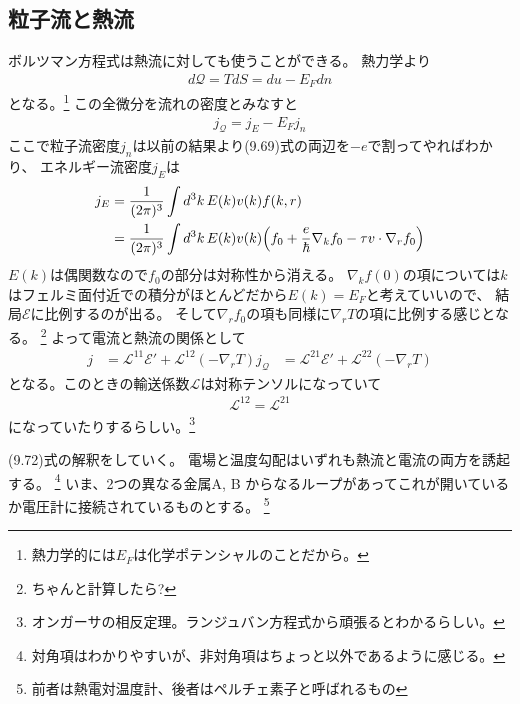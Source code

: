 \documentclass[11pt,dvipdfmx,a4paper]{jsarticle}
\begin{document}
\subsection*{粒子流と熱流}
ボルツマン方程式は熱流に対しても使うことができる。
熱力学より
\begin{align}
    d\mathcal{Q} = T dS = du - E_F dn %
\end{align}
となる。\footnote{熱力学的には\(E_F\)は化学ポテンシャルのことだから。}
この全微分を流れの密度とみなすと
\begin{align}
    j_\mathcal{Q} = j_E - E_F j_n %
\end{align}
ここで粒子流密度\(j_n\)は以前の結果より(9.69)式の両辺を\(-e\)で割ってやればわかり、
エネルギー流密度\(j_E\)は
\begin{align}
    j_E &= \frac{1}{(2\pi)^3} \int d^3k \, E(k)v(k)f(k,r)\\
    &=\frac{1}{(2\pi)^3} \int d^3k \, E(k)v(k)\qty(f_0 + \frac{e}{\hbar}\nabla_k f_0 - \tau v\cdot\nabla_r f_0)\\
\end{align}
\(E(k)\)は偶関数なので\(f_0\)の部分は対称性から消える。
\(\nabla_k f(0)\)の項については\(k\)はフェルミ面付近での積分がほとんどだから\(E(k) = E_F\)と考えていいので、
結局\(\mathscr{E}\)に比例するのが出る。
そして\(\nabla_r f_0\)の項も同様に\(\nabla_r T\)の項に比例する感じとなる。
\footnote{ちゃんと計算したら?}
よって電流と熱流の関係として
\begin{align}
    j &= \mathscr{L}^{11} \mathscr{E}' + \mathscr{L}^{12}(-\nabla_r T)%
    j_{\mathcal{Q}} &= \mathscr{L}^{21} \mathscr{E}' + \mathscr{L}^{22}(-\nabla_r T)%
\end{align}
となる。このときの輸送係数\(\mathscr{L}\)は対称テンソルになっていて
\begin{align}
    \mathscr{L}^{12} = \mathscr{L}^{21}
\end{align}
になっていたりするらしい。\footnote{オンガーサの相反定理。ランジュバン方程式から頑張るとわかるらしい。}

(9.72)式の解釈をしていく。
電場と温度勾配はいずれも熱流と電流の両方を誘起する。
\footnote{対角項はわかりやすいが、非対角項はちょっと以外であるように感じる。}
いま、2つの異なる金属A, B からなるループがあってこれが開いているか電圧計に接続されているものとする。
\footnote{前者は熱電対温度計、後者はペルチェ素子と呼ばれるもの}
\newline
\end{document}
